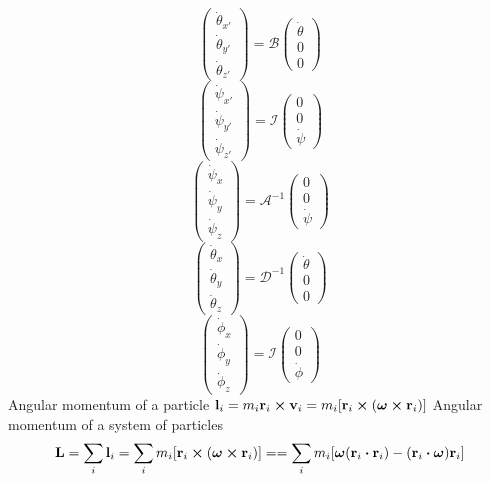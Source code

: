 \documentclass[12pt]{article}
\begin{document}
\[
\begin{pmatrix}
\dot{\theta}_{x'}\\
\dot{\theta}_{y'}\\
\dot{\theta}_{z'}
\end{pmatrix}
=\mathcal{B}
\begin{pmatrix}
\dot{\theta}\\0\\0
\end{pmatrix}
\]
\[
\begin{pmatrix}
\dot{\psi}_{x'}\\
\dot{\psi}_{y'}\\
\dot{\psi}_{z'}
\end{pmatrix}
=\mathcal{I}
\begin{pmatrix}
0\\0\\\dot{\psi}
\end{pmatrix}
\]
\[
\begin{pmatrix}
\dot{\psi}_{x}\\
\dot{\psi}_{y}\\
\dot{\psi}_{z}
\end{pmatrix}
=\mathcal{A}^{-1}
\begin{pmatrix}
0\\0\\\dot{\psi}
\end{pmatrix}
\]
\[
\begin{pmatrix}
\dot{\theta}_{x}\\
\dot{\theta}_{y}\\
\dot{\theta}_{z}
\end{pmatrix}
=\mathcal{D}^{-1}
\begin{pmatrix}
\dot{\theta}\\0\\0
\end{pmatrix}
\]
\[
\begin{pmatrix}
\dot{\phi}_{x}\\
\dot{\phi}_{y}\\
\dot{\phi}_{z}
\end{pmatrix}
=\mathcal{I}
\begin{pmatrix}
0\\0\\\dot{\phi}
\end{pmatrix}
\]
Angular momentum of a particle $\vb{l}_i=m_i\vb{r}_i\cp\vb{v}_i=m_i[\vb{r}_i\cp\qty(\bm{\omega}\cp\vb{r}_i)]$
Angular momentum of a system of particles \[\vb{L}=\sum_i\vb{l}_i=\sum_im_i[\vb{r}_i\cp\qty(\bm{\omega}\cp\vb{r}_i)]==\sum_im_i[\bm{\omega}\qty(\vb{r}_i\vdot\vb{r}_i)-\qty(\vb{r}_i\vdot\bm{\omega})\vb{r}_i]\]
\end{document}
